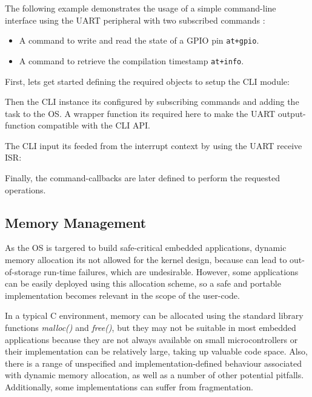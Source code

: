 The following example demonstrates the usage of a simple command-line interface using the UART peripheral with two subscribed commands :

\begin{itemize}
    \item A command to write and read the state of a GPIO pin \lstinline{at+gpio}.
    \item A command to retrieve the compilation timestamp \lstinline{at+info}.
\end{itemize}

First, lets get started defining the required objects to setup the CLI module:
\medskip



Then the CLI instance its configured by subscribing commands and adding the task to the OS. A wrapper function its required here to make the UART output-function compatible with the CLI API.



The CLI input its feeded from the interrupt context by using the UART receive ISR:



Finally, the command-callbacks are later defined to perform the requested operations.



\subsection{Memory Management} \label{memmanagement}
As the OS is targered to build safe-critical embedded applications, dynamic memory allocation its not allowed for the kernel design, because can lead to out-of-storage run-time failures, which are undesirable. However, some applications can be easily deployed using this allocation scheme, so a safe and portable implementation becomes relevant in the scope of the user-code. 

In a typical C environment, memory can be allocated using the standard library functions  \textit{malloc()} and \textit{free()}, but they may not be suitable in most embedded applications because they are not always available on small microcontrollers or their implementation can be relatively large, taking up valuable code space. Also, there is a range of unspecified and implementation-defined behaviour associated with dynamic memory allocation, as well as a number of other potential pitfalls. Additionally, some implementations can suffer from fragmentation.

